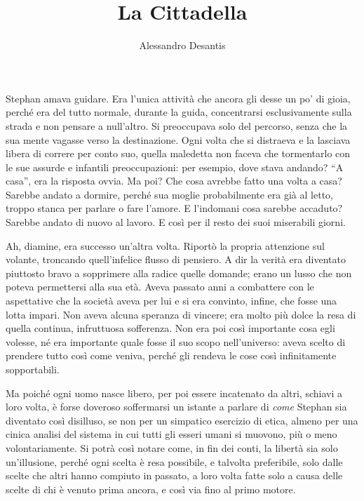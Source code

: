 \documentclass[a4paper,oneside,12pt]{memoir}
\title{La Cittadella}
\author{Alessandro Desantis}
\begin{document}
\begin{titlingpage}
\maketitle
\end{titlingpage}

\chapter{}

Stephan amava guidare. Era l'unica attività che ancora gli desse un po' di
gioia, perché era del tutto normale, durante la guida, concentrarsi
esclusivamente sulla strada e non pensare a null'altro. Si preoccupava solo del
percorso, senza che la sua mente vagasse verso la destinazione. Ogni volta che
si distraeva e la lasciava libera di correre per conto suo, quella maledetta non
faceva che tormentarlo con le sue assurde e infantili preoccupazioni: per
esempio, dove stava andando? ``A casa'', era la risposta ovvia. Ma poi? Che cosa
avrebbe fatto una volta a casa? Sarebbe andato a dormire, perché sua moglie
probabilmente era già al letto, troppo stanca per parlare o fare l'amore. E
l'indomani cosa sarebbe accaduto? Sarebbe andato di nuovo al lavoro. E così per
il resto dei suoi miserabili giorni.

Ah, diamine, era successo un'altra volta. Riportò la propria attenzione sul
volante, troncando quell'infelice flusso di pensiero. A dir la verità era
diventato piuttosto bravo a sopprimere alla radice quelle domande; erano un
lusso che non poteva permettersi alla sua età. Aveva passato anni a combattere
con le aspettative che la società aveva per lui e si era convinto, infine, che
fosse una lotta impari. Non aveva alcuna speranza di vincere; era molto più
dolce la resa di quella continua, infruttuosa sofferenza. Non era poi così
importante cosa egli volesse, né era importante quale fosse il suo scopo
nell'universo: aveva scelto di prendere tutto così come veniva, perché gli
rendeva le cose così infinitamente sopportabili.

Ma poiché ogni uomo nasce libero, per poi essere incatenato da altri, schiavi
a loro volta, è forse doveroso soffermarsi un istante a parlare di \emph{come}
Stephan sia diventato così disilluso, se non per un simpatico esercizio di
etica, almeno per una cinica analisi del sistema in cui tutti gli esseri umani
si muovono, più o meno volontariamente. Si potrà così notare come, in fin dei
conti, la libertà sia solo un'illusione, perché ogni scelta è resa possibile, e
talvolta preferibile, solo dalle scelte che altri hanno compiuto in passato, a
loro volta fatte solo a causa delle scelte di chi è venuto prima ancora, e così
via fino al primo motore.
\end{document}

